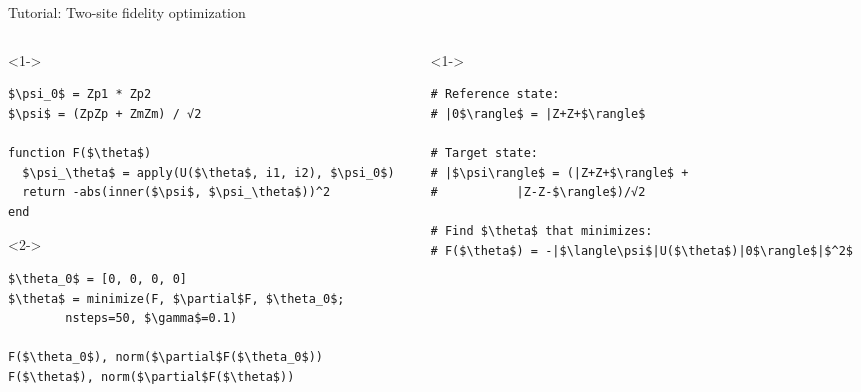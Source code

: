 \begin{frame}[fragile]{Tutorial: Two-site fidelity optimization}


\begin{columns}

\begin{column}{5cm}

\begin{onlyenv}<1->

\begin{lstlisting}[language=JuliaLocal, style=julia, mathescape, basicstyle=\small]
$\psi_0$ = Zp1 * Zp2
$\psi$ = (ZpZp + ZmZm) / √2

function F($\theta$)
  $\psi_\theta$ = apply(U($\theta$, i1, i2), $\psi_0$)
  return -abs(inner($\psi$, $\psi_\theta$))^2
end

 \end{lstlisting}

\end{onlyenv}

\begin{onlyenv}<2->

\begin{lstlisting}[language=JuliaLocal, style=julia, mathescape, basicstyle=\small]
$\theta_0$ = [0, 0, 0, 0]
$\theta$ = minimize(F, $\partial$F, $\theta_0$;
        nsteps=50, $\gamma$=0.1)

F($\theta_0$), norm($\partial$F($\theta_0$))
F($\theta$), norm($\partial$F($\theta$))
\end{lstlisting}

\end{onlyenv}

\end{column}

\begin{column}{5cm}

\begin{onlyenv}<1->

\begin{lstlisting}[style=julia, numbers=none, mathescape, basicstyle=\small]
# Reference state:
# |0$\rangle$ = |Z+Z+$\rangle$

# Target state:
# |$\psi\rangle$ = (|Z+Z+$\rangle$ +
#           |Z-Z-$\rangle$)/√2

# Find $\theta$ that minimizes:
# F($\theta$) = -|$\langle\psi$|U($\theta$)|0$\rangle$|$^2$
\end{lstlisting}

\end{onlyenv}


\end{column}
\end{columns}
\end{frame}
